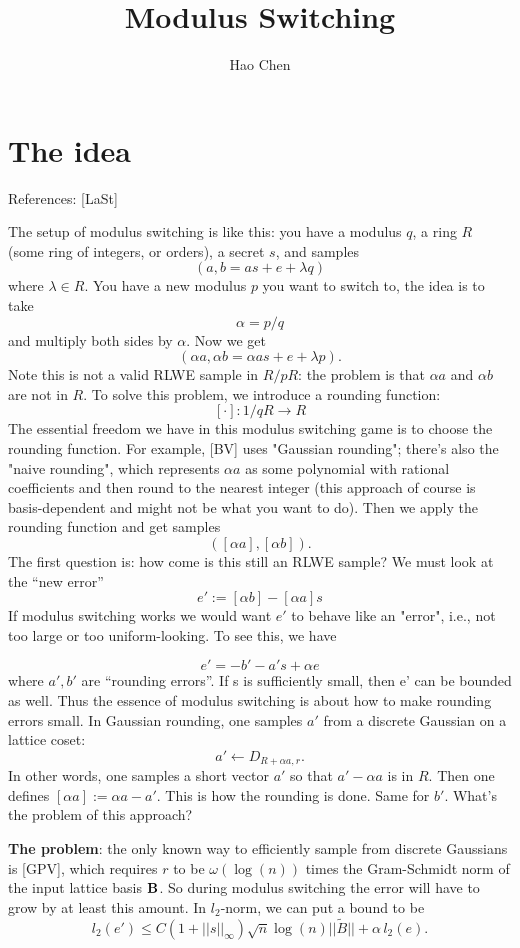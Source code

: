 \documentclass{amsart}
\title{Modulus Switching}
\author{Hao Chen}
\begin{document}
\maketitle

\section{The idea}

References: [LaSt]

The setup of modulus switching is like this: you have a
modulus $q$, a ring $R$ (some ring of integers, or orders), a secret $s$, and samples
\[
    (a,b = as+e + \lambda q)
\]
where $\lambda \in R$. You have a new modulus $p$ you want to switch to, the idea is to take
\[
    \alpha = p/q
\]
and multiply both sides by $\alpha$. Now we get
\[
(\alpha a, \alpha b  = \alpha a s + e + \lambda p).
\]
Note this is not a valid RLWE sample in $R/pR$: the problem is that $\alpha a$ and $\alpha b$ are not in $R$.
To solve this problem, we introduce a rounding function:
\[
    [\cdot]: 1/qR \to R
\]
The essential freedom we have in this modulus switching game is to choose the rounding function. For example,
[BV] uses "Gaussian rounding"; there's also the "naive rounding", which represents $\alpha a$ as some polynomial with rational coefficients and then round to the nearest
integer (this approach of course is basis-dependent and might not be what you want to do). Then we apply the rounding function and get samples
\[
    ([\alpha a], [\alpha b]).
\]
The first question is: how come is this still an RLWE sample? We must look at the ``new error''
\[
    e' := [\alpha b] - [\alpha a]s
\]
If modulus switching works we would want $e'$ to behave like an "error", i.e., not too large or too uniform-looking. To see this, we have

\[
e'= -b' - a's +\alpha e
\]
where $a', b'$ are ``rounding errors''. If s is sufficiently small, then e' can be bounded as well. Thus the essence of modulus switching is about how to make rounding errors small. In Gaussian rounding, one samples
$a'$ from a discrete Gaussian on a lattice coset:
$$a' \leftarrow D_{R+\alpha a, r}. $$
In other words, one samples a short vector $a'$ so that $a' - \alpha a $ is in $R$. Then one defines $[\alpha a] := \alpha a - a'$. This is how the rounding is done. Same for $b'$. What's the problem of this approach?

{\bf The problem}: the only known way to efficiently sample from discrete Gaussians is [GPV], which requires $r$ to be $\omega(\log(n))$ times the Gram-Schmidt norm of
the input lattice basis ${\bf B}$. So during modulus switching the error will have to grow by at least this
amount. In $l_2$-norm, we can put a bound to be
\[
    l_2(e') \leq C(1+||s||_\infty) \sqrt{n} \log(n) ||\tilde{B}|| + \alpha \, l_2(e).
\]
\end{document}
